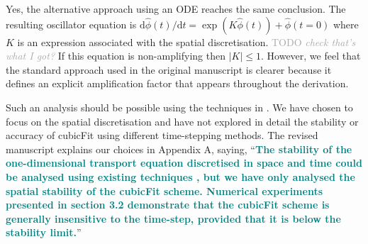 \documentclass[times]{elsarticle}
\newcommand{\TODO}[1]{\textcolor{darkgray}{TODO \textit{#1}}}
\newcommand{\revtwo}[1]{\textcolor{teal}{\textbf{#1}}}
\begin{document}
\begin{quotation}
\begin{comment}
\item The presentation of the analysis in Appendix~A is somewhat confusing. It appears
to use a time discretization by introducing a time step $\Delta t$ and an amplification
factor $A$, (and hence a Courant number $v \Delta t / \Delta x$) whereas the
analysis is, in fact, continuous in time. It might be clearer to set
$\phi(x_j , t) = \hat{\phi}(t) \mathrm{e}^{i j k \Delta x}$ and form an ODE for
$\hat{\phi}$, etc. I think the conclusion would be the same.
\end{comment}
\end{quotation}
Yes, the alternative approach using an ODE reaches the same conclusion.  The resulting oscillator equation is $\mathrm{d} \hat{\phi}(t) / \mathrm{d} t = \exp(K\hat{\phi}(t)) + \hat{\phi}(t=0)$ where $K$ is an expression associated with the spatial discretisation.  \TODO{check that's what I got?} If this equation is non-amplifying then $\lvert K \rvert \leq 1$.  However, we feel that the standard approach used in the original manuscript is clearer because it defines an explicit amplification factor that appears throughout the derivation.

\begin{quotation}
\begin{comment}
\item Might it be possible to include the time discretization (2) in the stability analysis?
It would be interesting to know if the weak instability of (2) (noted on p3) affects
the constraints (57), (58), (63).
\end{comment}
\end{quotation}
Such an analysis should be possible using the techniques in \citep{baldauf2008}.  We have chosen to focus on the spatial discretisation and have not explored in detail the stability or accuracy of cubicFit using different time-stepping methods.  The revised manuscript explains our choices in Appendix A, saying, ``\revtwo{The stability of the one-dimensional transport equation discretised in space and time could be analysed using existing techniques \citep{baldauf2008}, but we have only analysed the spatial stability of the cubicFit scheme.  Numerical experiments presented in section 3.2 demonstrate that the cubicFit scheme is generally insensitive to the time-step, provided that it is below the stability limit.}''
\end{document}
